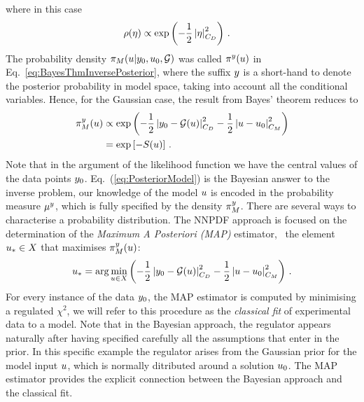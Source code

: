where in this case 
\begin{align}
  \label{eq:RhoGauss}
  \rho(\eta) &\propto \exp\left(
               -\frac12 \left|\eta\right|_{C_{D}}^2
               \right)\, .
\end{align}
The probability density
$\pi_M(u|y_0,u_0,\mathcal{G})$ was called
$\pi^y(u)$ in Eq.~\ref{eq:BayesThmInversePosterior}, where the suffix
$y$ is a short-hand to denote the posterior probability in model space,
taking into account all the conditional variables. Hence, for the Gaussian case,
the result from Bayes' theorem reduces to
\begin{align}
  \label{eq:PosteriorModel}
  \pi_M^y(u) &\propto 
  \exp\left(
  -\frac12 \left| y_0 - \mathcal{G}(u) \right|_{C_{D}}^2
  -\frac12 \left| u - u_0 \right|_{C_M}^2
  \right)\\ 
  &= \exp\left[
    - S(u)
  \right]\, .
\end{align}
Note that in the argument of the likelihood function we have the central values
of the data points $y_0$. Eq.~(\ref{eq:PosteriorModel}) is the
Bayesian answer to the inverse problem, our knowledge of the model $u$
is encoded in the probability measure $\mu^y$, which is fully specified by
the density $\pi_M^y$. There are several ways to characterise a probability
distribution. The NNPDF approach is focused on the determination of the {\em
Maximum A Posteriori (MAP)} estimator, \ie\ the element $u_* \in X$
that maximises $\pi_M^y(u)$:
\begin{align}\label{eq:MAP}
  u_* = \arg\min_{u \in X} 
  \left(
  -\frac12 \left| y_0 - \mathcal{G}(u) \right|_{C_{D}}^2
  -\frac12 \left| u - u_0 \right|_{C_M}^2
  \right)\, .
\end{align}
For every instance of the data $y_0$, the MAP estimator is computed by
minimising a regulated $\chi^2$, we will refer to this procedure as the {\em
classical fit} of experimental data to a model. Note that in the Bayesian
approach, the regulator appears naturally after having specified carefully all
the assumptions that enter in the prior. In this specific example the regulator
arises from the Gaussian prior for the model input $u$, which is
normally ditributed around a solution $u_0$. The MAP estimator
provides the explicit connection between the Bayesian approach and the classical
fit.

